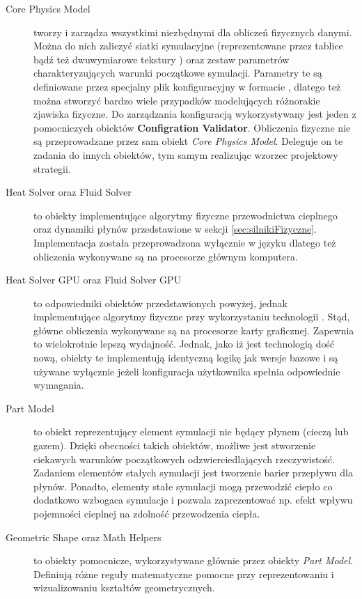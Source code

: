 \begin{description}

\item[Core Physics Model] tworzy i zarządza wszystkimi niezbędnymi dla obliczeń
fizycznych danymi. Można do nich zaliczyć siatki symulacyjne (reprezentowane
przez tablice \js bądź też dwuwymiarowe tekstury ) oraz zestaw
parametrów charakteryzujących warunki początkowe symulacji. Parametry te są
definiowane przez specjalny plik konfiguracyjny w formacie , dlatego
też można stworzyć bardzo wiele przypadków modelujących różnorakie zjawiska
fizyczne. Do zarządzania konfiguracją wykorzystywany jest jeden z pomocniczych
obiektów \textbf{Configration Validator}. Obliczenia fizyczne nie są
przeprowadzane przez sam obiekt \emph{Core Physics Model}. Deleguje on te
zadania do innych obiektów, tym samym realizując wzorzec projektowy strategii.

\item[Heat Solver oraz Fluid Solver] to obiekty implementujące algorytmy
fizyczne przewodnictwa cieplnego oraz dynamiki płynów przedstawione w sekcji
\ref{sec:silnikiFizyczne}. Implementacja została przeprowadzona wyłącznie w
języku \js dlatego też obliczenia wykonywane są na procesorze głównym
komputera.

\item[Heat Solver GPU oraz Fluid Solver GPU] to odpowiedniki obiektów
przedstawionych powyżej, jednak implementujące algorytmy fizyczne przy
wykorzystaniu technologii . Stąd, główne obliczenia wykonywane są na
procesorze karty graficznej. Zapewnia to wielokrotnie lepszą wydajność.
Jednak, jako iż  jest technologią dość nową, obiekty te implementują
identyczną logikę jak wersje bazowe i są używane wyłącznie jeżeli konfiguracja
użytkownika spełnia odpowiednie wymagania.

\item[Part Model] to obiekt reprezentujący element symulacji nie będący płynem
(cieczą lub gazem). Dzięki obecności takich obiektów, możliwe jest stworzenie
ciekawych warunków początkowych odzwierciedlających rzeczywistość.  Zadaniem
elementów stałych symulacji jest tworzenie barier przepływu dla płynów. Ponadto,
elementy stałe symulacji mogą przewodzić ciepło co dodatkowo wzbogaca symulacje
i pozwala zaprezentować np. efekt wpływu pojemności cieplnej na zdolność
przewodzenia ciepła.

\item[Geometric Shape oraz Math Helpers] to obiekty pomocnicze, wykorzystywane
głównie przez obiekty \emph{Part Model}. Definiują różne reguły matematyczne
pomocne przy reprezentowaniu i wizualizowaniu kształtów geometrycznych.

\end{description}

